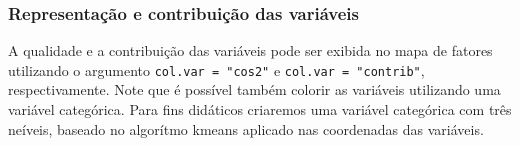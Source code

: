 \documentclass[
]{book}
\newenvironment{Shaded}{\begin{snugshade}}{\end{snugshade}}
\newcommand{\DataTypeTok}[1]{\textcolor[rgb]{0.13,0.29,0.53}{#1}}
\newcommand{\DecValTok}[1]{\textcolor[rgb]{0.00,0.00,0.81}{#1}}
\newcommand{\KeywordTok}[1]{\textcolor[rgb]{0.13,0.29,0.53}{\textbf{#1}}}
\newcommand{\NormalTok}[1]{#1}
\newcommand{\OperatorTok}[1]{\textcolor[rgb]{0.81,0.36,0.00}{\textbf{#1}}}
\newcommand{\OtherTok}[1]{\textcolor[rgb]{0.56,0.35,0.01}{#1}}
\newcommand{\StringTok}[1]{\textcolor[rgb]{0.31,0.60,0.02}{#1}}
\begin{document}
\hypertarget{representauxe7uxe3o-e-contribuiuxe7uxe3o-das-variuxe1veis}{%
\subsubsection{Representação e contribuição das variáveis}\label{representauxe7uxe3o-e-contribuiuxe7uxe3o-das-variuxe1veis}}

A qualidade e a contribuição das variáveis pode ser exibida no mapa de fatores utilizando o argumento \texttt{col.var\ =\ "cos2"} e \texttt{col.var\ =\ "contrib"}, respectivamente. Note que é possível também colorir as variáveis utilizando uma variável categórica. Para fins didáticos criaremos uma variável categórica com três neíveis, baseado no algorítmo kmeans aplicado nas coordenadas das variáveis.

\begin{Shaded}
\end{Shaded}
\end{document}
